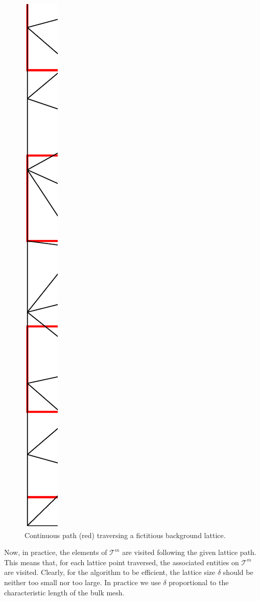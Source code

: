 \documentclass[a4paper,12pt,onecolumn]{article}
\begin{document}
\begin{figure}[htbp]
\centering
\includegraphics[width=.25\textwidth]{figures/velocity_interpolation_path.ps}
\caption[Continuous path traversing a fictitious background lattice]
{Continuous path (red) traversing a fictitious background lattice.}
\label{fig:velocity_interpolation_path}
\end{figure}%
Now, in practice, the elements of $\mathcal{T}^m$ are visited following the
given lattice path. This means that, for each lattice point traversed, the
associated entities on $\mathcal{T}^m$ are visited.
Clearly, for the algorithm to be efficient, the lattice size $\delta$ should be
neither too small nor too large.
In practice we use $\delta$ proportional to the characteristic length of the
bulk mesh.
\end{document}
